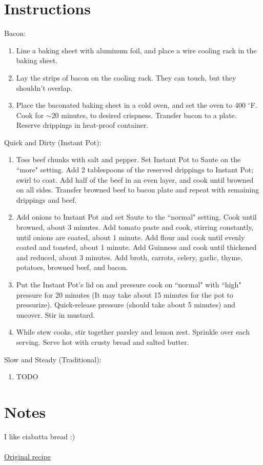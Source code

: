 \documentclass[11pt]{article}
\begin{document}
	\section*{Instructions}
	Bacon:
	\begin{enumerate}
		\item Line a baking sheet with aluminum foil, and place a wire cooling rack in the baking sheet.
		\item Lay the strips of bacon on the cooling rack. They can touch, but they shouldn't overlap.
		\item Place the baconated baking sheet in a cold oven, and set the oven to 400 $^\circ$F. Cook for $\sim$20 minutes, to desired crispness. Transfer bacon to a plate. Reserve drippings in heat-proof container.
	\end{enumerate}
	\vspace{1ex}
	
	Quick and Dirty (Instant Pot):
	\begin{enumerate}
		\item Toss beef chunks with salt and pepper. Set Instant Pot to Saute on the ``more" setting. Add 2 tablespoons of the reserved drippings to Instant Pot; swirl to coat. Add half of the beef in an even layer, and cook until browned on all sides. Transfer browned beef to bacon plate and repeat with remaining drippings and beef.
		\item Add onions to Instant Pot and set Saute to the ``normal" setting. Cook until browned, about 3 minutes. Add tomato paste and cook, stirring constantly, until onions are coated, about 1 minute. Add flour and cook until evenly coated and toasted, about 1 minute. Add Guinness and cook until thickened and reduced, about 3 minutes. Add broth, carrots, celery, garlic, thyme, potatoes, browned beef, and bacon.
		\item Put the Instant Pot's lid on and pressure cook on ``normal" with ``high" pressure for 20 minutes (It may take about 15 minutes for the pot to pressurize). Quick-release pressure (should take about 5 minutes) and uncover. Stir in mustard.
		\item While stew cooks, stir together parsley and lemon zest. Sprinkle over each serving. Serve hot with crusty bread and salted butter.
	\end{enumerate}
	\vspace{1ex}
	
	Slow and Steady (Traditional):
	\begin{enumerate}
		\item TODO
	\end{enumerate}
	\vspace{1ex}
	
	\section*{Notes}
	I like ciabatta bread :)\\\\ \href{https://web.archive.org/web/20200811194325/https://www.myrecipes.com/recipe/irish-beef-stew-with-guinness}{Original recipe}
	
\end{document}
